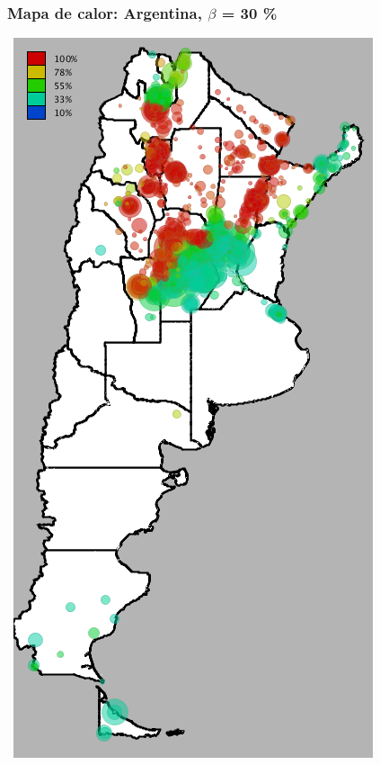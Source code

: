 \documentclass{beamer}
\begin{document}
\begin{frame}
	\frametitle{Mapa de calor: Argentina, $\beta$ = 30 \%}
	\center\
	\includegraphics[height=.9\textheight,width = .9\columnwidth, keepaspectratio]
	{slides/201112_hi_res_argentina_usuarios_proporcion_circulos_beta30.png}
\end{frame}
\end{document}
